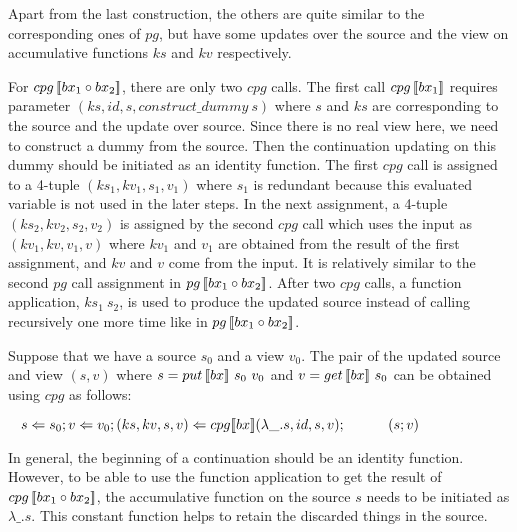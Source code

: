 Apart from the last construction, the others are quite similar to the corresponding ones of $pg$, but have some updates over the source and the view on accumulative functions $ks$ and $kv$ respectively.

For $cpg \, [\![bx_1 \circ bx_2]\!]$, there are only two $cpg$ calls. The first call $cpg \, [\![bx_1]\!]$ requires parameter $(ks, id, s, construct\_dummy \ s)$ where $s$ and $ks$ are corresponding to the source and the update over source. Since there is no real view here, we need to construct a dummy from the source. Then the continuation updating on this dummy should be initiated as an identity function. The first $cpg$ call is assigned to a 4-tuple $(ks_1, kv_1, s_1, v_1)$ where $s_1$ is redundant because this evaluated variable is not used in the later steps. In the next assignment, a 4-tuple $(ks_2, kv_2, s_2, v_2)$ is assigned by the second $cpg$ call which uses the input as $(kv_1, kv, v_1, v)$ where $kv_1$ and $v_1$ are obtained from the result of the first assignment, and $kv$ and $v$ come from the input. It is relatively similar to the second $pg$ call assignment in $pg \, [\![bx_1 \circ bx_2]\!]$. After two $cpg$ calls, a function application, $ks_1 \ s_2$, is used to produce the updated source instead of calling recursively one more time like in $pg \, [\![bx_1 \circ bx_2]\!]$.

Suppose that we have a source $s_0$ and a view $v_0$. The pair of the updated source and view $(s, v)$ where $s = put \, [\![bx]\!] \ s_0 \ v_0$ and $v = get \, [\![bx]\!] \ s_0$ can be obtained using $cpg$ as follows:

    $\tab s \Leftarrow s_0; v \Leftarrow v_0; (ks, kv, s, v) \Leftarrow \cpg{bx}{\lambda \_.s}{id}{s}{v};\\
        \tab \qtab (s; v)$

In general, the beginning of a continuation should be an identity function. However, to be able to use the function application to get the result of $cpg \, [\![bx_1 \circ bx_2]\!]$, the accumulative function on the source $s$ needs to be initiated as $\lambda \_.s$. This constant function helps to retain the discarded things in the source.


